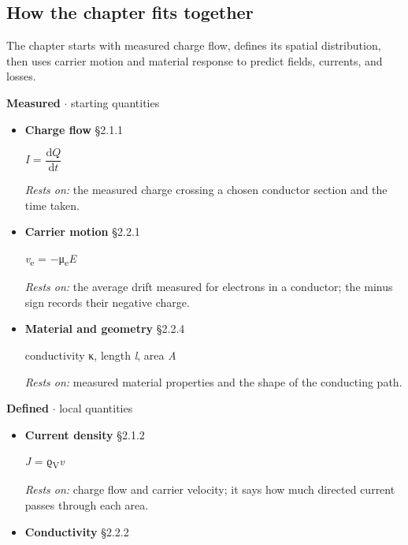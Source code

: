 \documentclass[11pt]{article}
\begin{document}
\begin{keepsection}
\section{How the chapter fits together}

The chapter starts with measured charge flow, defines its spatial distribution, then uses carrier motion and material response to predict fields, currents, and losses.

\textbf{Measured} \ensuremath{\cdot} starting quantities

\begin{itemize}
\item {}
\textbf{Charge flow} \hfill{\small\color{FAUblue}§2.1.1}

\textit{I} = {\small\ensuremath{\dfrac{\mathrm{d}{Q}}{\mathrm{d}{t}}}}

\emph{Rests on:} the measured charge crossing a chosen conductor section and the time taken.
\item {}
\textbf{Carrier motion} \hfill{\small\color{FAUblue}§2.2.1}

\textit{v}\textsubscript{e} = \ensuremath{-}μ\textsubscript{e}\textit{E}

\emph{Rests on:} the average drift measured for electrons in a conductor; the minus sign records their negative charge.
\item {}
\textbf{Material and geometry} \hfill{\small\color{FAUblue}§2.2.4}

conductivity κ, length \textit{l}, area \textit{A}

\emph{Rests on:} measured material properties and the shape of the conducting path.
\end{itemize}

\textbf{Defined} \ensuremath{\cdot} local quantities

\begin{itemize}
\item {}
\textbf{Current density} \hfill{\small\color{FAUblue}§2.1.2}

\textit{J} = ϱ\textsubscript{V}\textit{v}

\emph{Rests on:} charge flow and carrier velocity; it says how much directed current passes through each area.
\item {}
\textbf{Conductivity} \hfill{\small\color{FAUblue}§2.2.2}


\end{itemize}
\end{keepsection}
\end{document}
